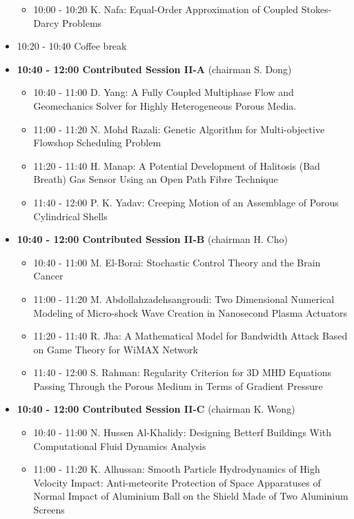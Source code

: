 \documentclass[10pt]{article}%
\begin{document}
\begin{itemize}
\begin{itemize}
    \item 10:00 - 10:20 {K. Nafa}: {Equal-Order Approximation of Coupled Stokes-Darcy Problems}
  \end{itemize}
  \item 10:20 - 10:40 Coffee break
  \item {\bf 10:40 - 12:00 Contributed Session II-A} (chairman S. Dong) 
  \begin{itemize}
    \item 10:40 - 11:00 {D. Yang}: {A Fully Coupled Multiphase Flow and Geomechanics Solver for Highly Heterogeneous Porous Media.} %
    \item 11:00 - 11:20 {N. Mohd Razali}: {Genetic Algorithm for Multi-objective Flowshop Scheduling Problem} %
    \item 11:20 - 11:40 {H. Manap}: {A Potential Development of Halitosis (Bad Breath) Gas Sensor Using an Open Path Fibre Technique}
    \item 11:40 - 12:00 {P. K. Yadav}: {Creeping Motion of an Assemblage of Porous Cylindrical Shells}
  \end{itemize}
  \item {\bf 10:40 - 12:00 Contributed Session II-B} (chairman H. Cho) 
  \begin{itemize}
    \item 10:40 - 11:00 {M. El-Borai}: {Stochastic Control Theory and the Brain Cancer}   
    \item 11:00 - 11:20 {M. Abdollahzadehsangroudi}: {Two Dimensional Numerical Modeling of Micro-shock Wave Creation in Nanosecond Plasma Actuators}
    \item 11:20 - 11:40 {R. Jha}: {A Mathematical Model for Bandwidth Attack Based on Game Theory for WiMAX Network}
    \item 11:40 - 12:00 {S. Rahman}: {Regularity Criterion for 3D MHD Equations Passing Through the Porous Medium in Terms of Gradient Pressure} %
  \end{itemize}
  \newpage
  \item {\bf 10:40 - 12:00 Contributed Session II-C} (chairman K. Wong) 
  \begin{itemize}
    \item 10:40 - 11:00 {N. Hussen Al-Khalidy}: {Designing Betterf Buildings With Computational Fluid Dynamics Analysis}
    \item 11:00 - 11:20 {K. Alhussan}: {Smooth Particle Hydrodynamics of High Velocity Impact: Anti-meteorite Protection of Space Apparatuses of Normal Impact of Aluminium Ball on the Shield Made of Two Aluminium Screens}

\end{itemize}
\end{itemize}
\end{document}

